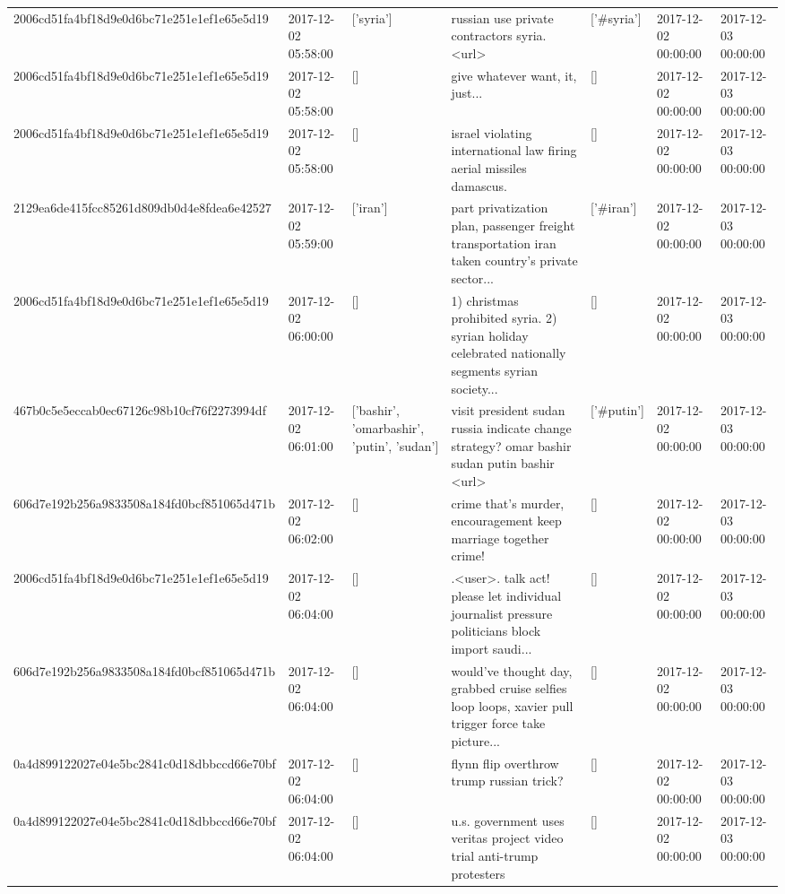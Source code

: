 \begin{tabular}{lllllll}
2006cd51fa4bf18d9e0d6bc71e251e1ef1e65e5d19 & 2017-12-02 05:58:00 & ['syria'] & russian use private contractors syria. <url> & ['#syria'] & 2017-12-02 00:00:00 & 2017-12-03 00:00:00 \\
2006cd51fa4bf18d9e0d6bc71e251e1ef1e65e5d19 & 2017-12-02 05:58:00 & [] & give whatever want, it, just... & [] & 2017-12-02 00:00:00 & 2017-12-03 00:00:00 \\
2006cd51fa4bf18d9e0d6bc71e251e1ef1e65e5d19 & 2017-12-02 05:58:00 & [] & israel violating international law firing aerial missiles damascus. & [] & 2017-12-02 00:00:00 & 2017-12-03 00:00:00 \\
2129ea6de415fcc85261d809db0d4e8fdea6e42527 & 2017-12-02 05:59:00 & ['iran'] & part privatization plan, passenger freight transportation iran taken country's private sector... & ['#iran'] & 2017-12-02 00:00:00 & 2017-12-03 00:00:00 \\
2006cd51fa4bf18d9e0d6bc71e251e1ef1e65e5d19 & 2017-12-02 06:00:00 & [] & 1) christmas prohibited syria. 2) syrian holiday celebrated nationally segments syrian society... & [] & 2017-12-02 00:00:00 & 2017-12-03 00:00:00 \\
467b0c5e5eccab0ec67126c98b10cf76f2273994df & 2017-12-02 06:01:00 & ['bashir', 'omarbashir', 'putin', 'sudan'] & visit president sudan russia indicate change strategy? omar bashir sudan putin bashir <url> & ['#putin'] & 2017-12-02 00:00:00 & 2017-12-03 00:00:00 \\
606d7e192b256a9833508a184fd0bcf851065d471b & 2017-12-02 06:02:00 & [] & crime that's murder, encouragement keep marriage together crime! & [] & 2017-12-02 00:00:00 & 2017-12-03 00:00:00 \\
2006cd51fa4bf18d9e0d6bc71e251e1ef1e65e5d19 & 2017-12-02 06:04:00 & [] & .<user>. talk act! please let individual journalist pressure politicians block import saudi... & [] & 2017-12-02 00:00:00 & 2017-12-03 00:00:00 \\
606d7e192b256a9833508a184fd0bcf851065d471b & 2017-12-02 06:04:00 & [] & would've thought day, grabbed cruise selfies loop loops, xavier pull trigger force take picture... & [] & 2017-12-02 00:00:00 & 2017-12-03 00:00:00 \\
0a4d899122027e04e5bc2841c0d18dbbccd66e70bf & 2017-12-02 06:04:00 & [] & flynn flip overthrow trump russian trick? & [] & 2017-12-02 00:00:00 & 2017-12-03 00:00:00 \\
0a4d899122027e04e5bc2841c0d18dbbccd66e70bf & 2017-12-02 06:04:00 & [] & u.s. government uses veritas project video trial anti-trump protesters & [] & 2017-12-02 00:00:00 & 2017-12-03 00:00:00 \\

\end{tabular}
